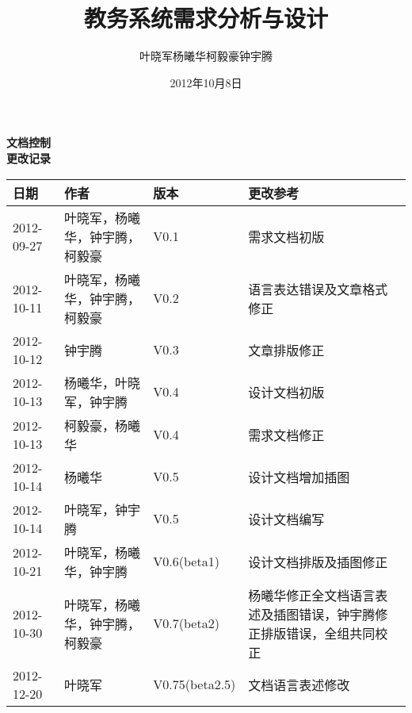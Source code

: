 \documentclass[a4paper,12pt]{article}
\begin{document}
\begin{CJK*}{UTF8}{stzhongsong}

\title{教务系统需求分析与设计}
\author{叶晓军\quad 杨曦华\quad 柯毅豪\quad 钟宇腾}
\date{2012年10月8日}



\addtolength{\hoffset}{-0.5cm}

\noindent \textbf{\LARGE 文档控制}\\

\noindent \textbf{\large 更改记录}\\
\begin{table}[H]
  \begin{tabularx}{\textwidth}{|l|l|l|X|}
    \hline
    \textbf{日期} & \textbf{作者} & \textbf{版本} & \textbf{更改参考}\\
    \hline
    2012-09-27&叶晓军，杨曦华，钟宇腾，柯毅豪&V0.1&需求文档初版\\
    \hline
    2012-10-11&叶晓军，杨曦华，钟宇腾，柯毅豪&V0.2&语言表达错误及文章格式修正\\
    \hline
    2012-10-12&钟宇腾&V0.3&文章排版修正\\
    \hline
    2012-10-13&杨曦华，叶晓军，钟宇腾&V0.4&设计文档初版\\
    \hline
    2012-10-13&柯毅豪，杨曦华&V0.4&需求文档修正\\
    \hline
    2012-10-14&杨曦华&V0.5&设计文档增加插图\\
    \hline
    2012-10-14&叶晓军，钟宇腾&V0.5&设计文档编写\\
    \hline
    2012-10-21&叶晓军，杨曦华，钟宇腾&V0.6(beta1)&设计文档排版及插图修正\\
    \hline
    2012-10-30&叶晓军，杨曦华，钟宇腾，柯毅豪&V0.7(beta2)&杨曦华修正全文档语言表述及插图错误，钟宇腾修正排版错误，全组共同校正\\
    \hline
    2012-12-20&叶晓军&V0.75(beta2.5)&文档语言表述修改\\
    \hline
  \end{tabularx}
\end{table}

\newpage

\tableofcontents
\newpage

\pagestyle{fancy}

\newpage


\newpage


\newpage


\newpage
\end{CJK*}
\end{document}
